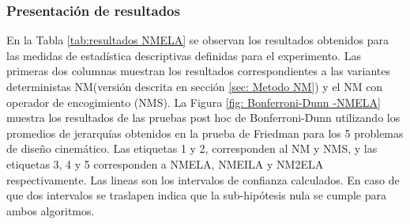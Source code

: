  \subsubsection{Presentación de resultados}
 En la Tabla \ref{tab:resultados NMELA} se observan los resultados obtenidos para las medidas de estadística descriptivas definidas para el experimento. Las primeras dos columnas muestran los resultados correspondientes a las variantes deterministas NM(versión descrita en sección \ref{sec: Metodo NM}) y el NM con operador de encogimiento (NMS).  La Figura \ref{fig: Bonferroni-Dunn -NMELA} muestra los resultados de las pruebas post hoc de Bonferroni-Dunn utilizando los promedios de jerarquías obtenidos en la prueba de Friedman para los 5 problemas de diseño cinemático. Las etiquetas 1 y 2, corresponden al NM y NMS, y las etiquetas 3, 4 y 5 corresponden a NMELA, NMEILA y NM2ELA respectivamente. Las lineas son los intervalos de confianza calculados. En caso de que dos intervalos se traslapen indica que la sub-hipótesis nula se cumple para ambos algoritmos.
